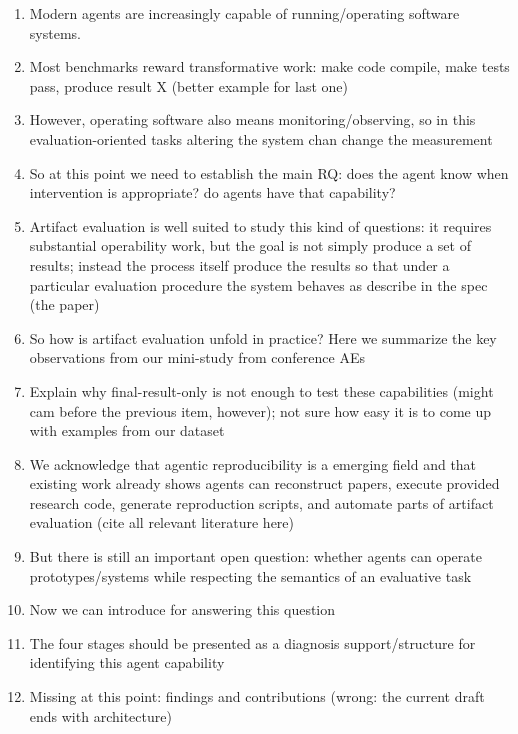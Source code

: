 \begin{enumerate}
  \item Modern agents are increasingly capable of running/operating software systems.
  \item Most benchmarks reward transformative work: make code compile, make tests pass, produce result X (better example for last one)
  \item However, operating software also means monitoring/observing, so in this evaluation-oriented tasks altering the system chan change the measurement
  \item So at this point we need to establish the main RQ: does the agent know when intervention is appropriate? do agents have that capability?
  \item Artifact evaluation is well suited to study this kind of questions: it requires substantial operability work, but the goal is not simply produce a set of results; instead the process itself produce the results so that under a particular evaluation procedure the system behaves as describe in the spec (the paper)
  \item So how is artifact evaluation unfold in practice? Here we summarize the key observations from our mini-study from conference AEs
  \item Explain why final-result-only is not enough to test these capabilities (might cam before the previous item, however); not sure how easy it is to come up with examples from our dataset
  \item We acknowledge that agentic reproducibility is a emerging field and that existing work already shows agents can reconstruct papers, execute provided research code, generate reproduction scripts, and automate parts of artifact evaluation (cite all relevant literature here)
  \item But there is still an important open question: whether agents can operate prototypes/systems while respecting the semantics of an evaluative task
  \item Now we can introduce \aebench for answering this question
  \item The four stages should be presented as a diagnosis support/structure for identifying this agent capability
  \item Missing at this point: findings and contributions (wrong: the current draft ends with architecture)
\end{enumerate}

\bo{------}


